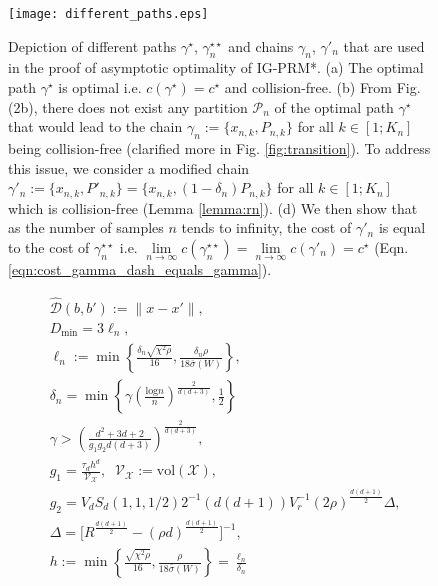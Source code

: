 \documentclass[Afour,sageh,times]{sagej}
\begin{document}
\begin{figure*}[ht!]
\centering
\texttt{[image: different\_paths.eps]}
\caption{Depiction of different paths $\gamma^\star$, $\gamma^{\star\star}_n$ and chains $\gamma_n$, $\gamma'_n$ that are used in the proof of asymptotic optimality of IG-PRM*. (a) The optimal path $\gamma^\star$ is optimal i.e. $c(\gamma^\star)=c^\star$ and collision-free. (b) From Fig. (2b), there does not exist any partition $\mathcal{P}_n$ of the optimal path $\gamma^\star$ that would lead to the chain $\gamma_n:=\{x_{n,k},P_{n,k}\}$ for all $k\in[1;K_n]$ being collision-free (clarified more in Fig. \ref{fig:transition}). To address this issue, we consider a modified chain $\gamma'_n:=\{x_{n,k},P'_{n,k}\}=\{x_{n,k},(1-\delta_n)P_{n,k}\}$ for all $k\in[1;K_n]$ which is collision-free (Lemma \ref{lemma:rn}). (d) We then show that as the number of samples $n$ tends to infinity, the cost of $\gamma'_n$ is equal to the cost of $\gamma^{\star\star}_n$ i.e. $\underset{n\rightarrow\infty}{\lim} c(\gamma^{\star\star}_n)=\underset{n\rightarrow\infty}{\lim} c(\gamma'_n)=c^\star$ (Eqn. \ref{eqn:cost_gamma_dash_equals_gamma}). }
\label{fig:1}
\end{figure*}
\begin{subequations}
\begin{align} 
& \hat{\mathcal{D}}(b,b'):=\|x-x'\|,\\
& D_{\text{min}}=3\ell_n,\\
   & \ell_n:=\min\left\{\frac{\delta_n\sqrt{ \chi^2 \rho} }{16},\frac{\delta_n\rho }{18\bar{\sigma}(W)}\right\},\label{eq:ell_def}\\
   &\delta_n = \min \left\{ \gamma\left(\frac{\text{log}n}{n}\right)^\frac{2}{d(d+3)}, \frac{1}{2}\right\}\\
   &\gamma>\left(\frac{d^2+3d+2}{g_1 g_2 d(d+3)} \right)^\frac{2}{d(d+3)},\\
   &g_1=\frac{\tau_d  h^d}{  \mathcal{V}_{\mathcal{X}}},\;\;\mathcal{V}_\mathcal{X}:=\text{vol}(\mathcal{X}),\\
   & g_2=V_dS_d(1,1,1/2)2^{-1}(d(d+1))V_r^{-1}(2\rho)^{\frac{d(d+1)}{2}}\Delta,\\
   &\Delta=\bigg[R^{\frac{d(d+1)}{2}}- (\rho d)^{\frac{d(d+1)}{2}} \bigg]^{-1},\\
   &h:=\min\left\{\frac{\sqrt{ \chi^2 \rho} }{16},\frac{\rho }{18\bar{\sigma}(W)}\right\} = \frac{\ell_n}{\delta_n}
\end{align}
\end{subequations}
\end{document}
